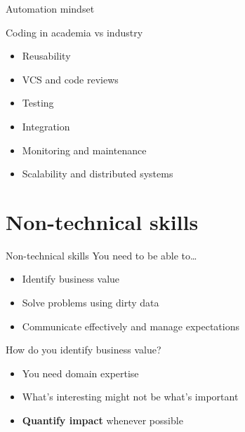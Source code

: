 \begin{frame}{Automation mindset}
\end{frame}

\begin{frame}{Coding in academia vs industry}
    \large%
    \begin{itemize}
        \setlength{\itemsep}{\medskipamount}
        \item Reusability
        \item VCS and code reviews
        \item Testing
        \item Integration
        \item Monitoring and maintenance
        \item Scalability and distributed systems
    \end{itemize}
\end{frame}

\section{Non-technical skills}

\begin{frame}{Non-technical skills}
    \large%
    You need to be able to\ldots
    \begin{itemize}
        \setlength{\itemsep}{\medskipamount}
        \item Identify business value
        \item Solve problems using dirty data
        \item Communicate effectively and manage expectations
    \end{itemize}
\end{frame}

\begin{frame}{How do you identify business value?}
    \large%
    \begin{itemize}
        \setlength{\itemsep}{\medskipamount}
        \item You need domain expertise
        \item What's interesting might not be what's important
        \item \textbf{Quantify impact} whenever possible
    \end{itemize}
\end{frame}

